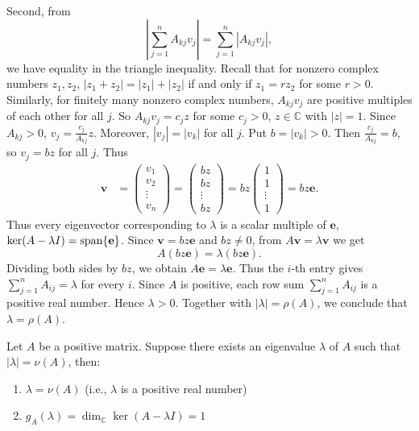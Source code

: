 \begin{pfbox}
Second, from
\[
\left|\sum_{j=1}^n A_{kj}v_j\right|
=
\sum_{j=1}^n |A_{kj}v_j|,
\]
we have equality in the triangle inequality. Recall that for nonzero complex numbers $z_1,z_2$, $|z_1+z_2|=|z_1|+|z_2|$ if and only if $z_1=rz_2$ for some $r>0$. Similarly, for finitely many nonzero complex numbers, $A_{kj}v_j$ are positive multiples of each other for all $j$.
So $A_{kj}v_j=c_jz$ for some $c_j>0$, $z\in\mathbb{C}$ with $|z|=1$. Since $A_{kj}>0$, $v_j=\frac{c_j}{A_{kj}}z$. Moreover, $|v_j|=|v_k|$ for all $j$. Put $b=|v_k|>0$. Then $\frac{c_j}{A_{kj}}=b$, so $v_j=bz$ for all $j$. Thus
\[
\begin{aligned}
\mathbf{v}
&=
\begin{pmatrix}
v_1\\
v_2\\
\vdots\\
v_n
\end{pmatrix}
=
\begin{pmatrix}
bz\\
bz\\
\vdots\\
bz
\end{pmatrix}
=
bz
\begin{pmatrix}
1\\
1\\
\vdots\\
1
\end{pmatrix}
=bz\mathbf{e}.
\end{aligned}
\]
Thus every eigenvector corresponding to $\lambda$ is a scalar multiple of $\mathbf{e}$,
$\ker(A-\lambda I)=\operatorname{span}\{\mathbf{e}\}$.
Since $\mathbf{v}=bz\mathbf{e}$ and $bz\neq 0$, from $A\mathbf{v}=\lambda\mathbf{v}$ we get
\[
A(bz\mathbf{e})
=
\lambda(bz\mathbf{e}).
\]
Dividing both sides by $bz$, we obtain $A\mathbf{e}=\lambda\mathbf{e}$.
Thus the $i$-th entry gives $\displaystyle\sum_{j=1}^n A_{ij}=\lambda$ for every $i$.
Since $A$ is positive, each row sum $\displaystyle\sum_{j=1}^n A_{ij}$ is a positive real number.
Hence $\lambda>0$.
Together with $|\lambda|=\rho(A)$, we conclude that $\lambda=\rho(A)$.
\end{pfbox}

\begin{corollary}
Let $A$ be a positive matrix. Suppose there exists an eigenvalue $\lambda$ of $A$ such that $|\lambda|=\nu(A)$, then:
\begin{enumerate}
    \item $\lambda=\nu(A)$ (i.e., $\lambda$ is a positive real number)
    \item $g_A(\lambda)=\dim_{\mathbb{C}}\ker(A-\lambda I)=1$
\end{enumerate}
\end{corollary}

